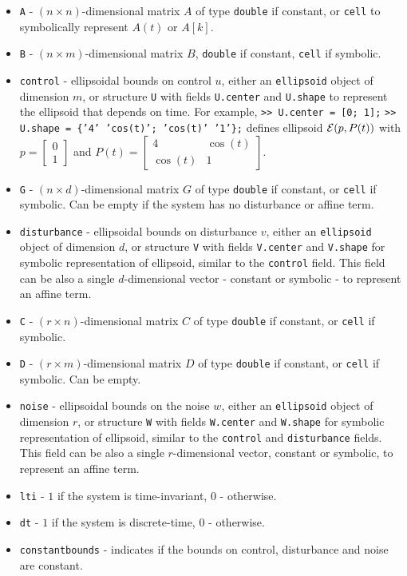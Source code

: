 \begin{itemize}
\item {\tt A} - $(n\times n)$-dimensional matrix $A$ of type {\tt double}
if constant, or {\tt cell} to symbolically represent $A(t)$ or $A[k]$.
\item {\tt B} - $(n\times m)$-dimensional matrix $B$, {\tt double} if constant,
{\tt cell} if symbolic.
\item {\tt control} - ellipsoidal bounds on control $u$,
either an {\tt ellipsoid}
object of dimension $m$, or structure {\tt U} with fields {\tt U.center} and
{\tt U.shape} to represent the ellipsoid that depends on time. For example,
\newline
{\tt >> U.center = [0; 1];}
\newline
{\tt >> U.shape = \{'4' 'cos(t)'; 'cos(t)' '1'\};}
\newline
defines ellipsoid $\EE(p, P(t))$ with $p=\left[\begin{array}{c}
0\\
1\end{array}\right]$ and $P(t) = \left[\begin{array}{cc}
4 & \cos(t)\\
\cos(t) & 1\end{array}\right]$.
\item {\tt G} - $(n\times d)$-dimensional matrix $G$ of type {\tt double}
if constant, or {\tt cell} if symbolic. Can be empty if the system has
no disturbance or affine term.
\item {\tt disturbance} - ellipsoidal bounds on disturbance $v$, either an
{\tt ellipsoid} object of dimension $d$, or structure {\tt V} with
fields {\tt V.center} and {\tt V.shape} for symbolic representation of
ellipsoid, similar to the {\tt control} field.
This field can be also a single $d$-dimensional vector - constant or symbolic -
to represent an affine term.
\item {\tt C} - $(r\times n)$-dimensional matrix $C$ of type {\tt double}
if constant, or {\tt cell} if symbolic.
\item {\tt D} - $(r\times m)$-dimensional matrix $D$ of type {\tt double}
if constant, or {\tt cell} if symbolic. Can be empty.
\item {\tt noise} - ellipsoidal bounds on the noise $w$, either an
{\tt ellipsoid} object of dimension $r$, or structure {\tt W} with
fields {\tt W.center} and {\tt W.shape} for symbolic representation of
ellipsoid, similar to the {\tt control} and {\tt disturbance} fields.
\newline
This field can be also a single $r$-dimensional vector, constant or symbolic,
to represent an affine term.
\item {\tt lti} - $1$ if the system is time-invariant, $0$ - otherwise.
\item {\tt dt} - $1$ if the system is discrete-time, $0$ - otherwise.
\item {\tt constantbounds} - indicates if the bounds on control, disturbance
and noise are constant.
\end{itemize}
